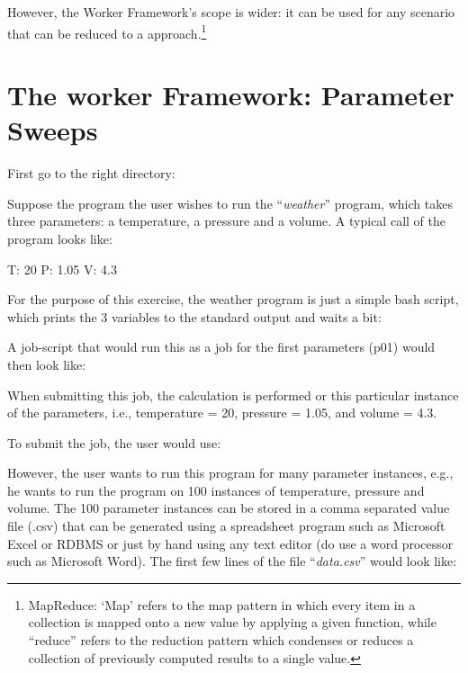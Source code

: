 However, the Worker Framework's scope is wider: it can be used for any scenario
that can be reduced to a  approach.\footnote{MapReduce:
`Map' refers to the map pattern in which every item in a collection is mapped
onto a new value by applying a given function, while ``reduce'' refers to the
reduction pattern which condenses or reduces a collection of previously
computed results to a single value.}

\section{The worker Framework: Parameter Sweeps}

First go to the right directory:

\begin{prompt}
\end{prompt}

Suppose the program the user wishes to run the ``\emph{weather}'' program,
which takes three parameters: a temperature, a pressure and a volume. A typical
call of the program looks like:

\begin{prompt}
T: 20  P: 1.05  V: 4.3
\end{prompt}

For the purpose of this exercise, the weather program is just a simple bash
script, which prints the 3 variables to the standard output and waits a bit:


A job-script that would run this as a job for the first parameters (p01) would
then look like:


When submitting this job, the calculation is performed or this particular
instance of the parameters, i.e., temperature = 20, pressure = 1.05, and volume
= 4.3.

To submit the job, the user would use:

\begin{prompt}
\end{prompt}

However, the user wants to run this program for many parameter instances, e.g.,
he wants to run the program on 100 instances of temperature, pressure and
volume.  The 100 parameter instances can be stored in a comma separated value
file (.csv) that can be generated using a spreadsheet program such as Microsoft
Excel or RDBMS or just by hand using any text editor (do  use a
word processor such as Microsoft Word). The first few lines of the file
``\emph{data.csv}'' would look like:

